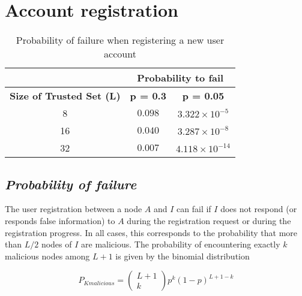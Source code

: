 \section{Account registration}
\label{sec:eval_account_registration}
  \begin{table}
    \centering
    \footnotesize
    \begin{tabular}{|c|c|c|}
      \cline{2-3}
      \multicolumn{1}{c|}{}&  \multicolumn{2}{c|}{\textbf{Probability to fail}} \\ \cline{2-3}
      \hline
      \textbf{Size of Trusted Set (L)} & \textbf{p = 0.3} & \textbf{p = 0.05} \\
      \hline \hline

      8 &  $0.098$ & $3.322 \times 10^{-5}$ \\
      \hline
      16 & $0.040$ & $3.287 \times 10^{-8}$  \\
      \hline
      32 & $0.007$ & $4.118 \times 10^{-14}$  \\
      \hline
    \end{tabular}
    \caption{Probability of failure when registering a new user account}
    \label{tab:p_account_registration}
  \end{table}
  
  \subsection{\textit{Probability of failure}}
    The user registration between a node $A$ and $I$ can fail if $I$ does
not respond (or responds false information) to $A$ during the registration request or during the registration
progress. In all cases, this corresponds to the probability that more than
$L/2$ nodes of $I$ are malicious. The probability of encountering exactly $k$
malicious nodes among $L +1$ is given by the binomial distribution

    \begin{equation} \label{eq:p_k_malicious_nodes}
      P_{K malicious} = \begin{pmatrix} L+1 \\ k\end{pmatrix} p^k (1-p)^{L+1-k}
    \end{equation}

